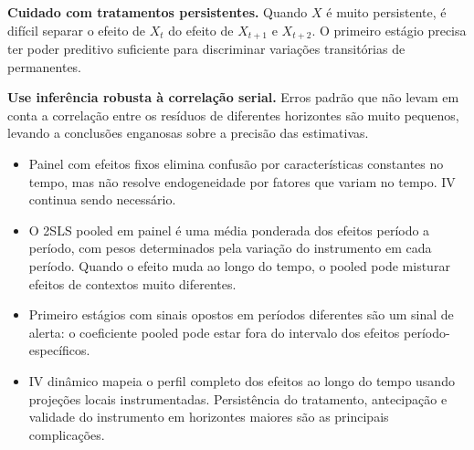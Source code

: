 \textbf{Cuidado com tratamentos persistentes.} Quando $X$ é muito persistente, é difícil separar o efeito de $X_t$ do efeito de $X_{t+1}$ e $X_{t+2}$. O primeiro estágio precisa ter poder preditivo suficiente para discriminar variações transitórias de permanentes.

\textbf{Use inferência robusta à correlação serial.} Erros padrão que não levam em conta a correlação entre os resíduos de diferentes horizontes são muito pequenos, levando a conclusões enganosas sobre a precisão das estimativas.

\begin{notabox}
\begin{itemize}[leftmargin=*]
  \item Painel com efeitos fixos elimina confusão por características constantes no tempo, mas não resolve endogeneidade por fatores que variam no tempo. IV continua sendo necessário.
  \item O 2SLS pooled em painel é uma média ponderada dos efeitos período a período, com pesos determinados pela variação do instrumento em cada período. Quando o efeito muda ao longo do tempo, o pooled pode misturar efeitos de contextos muito diferentes.
  \item Primeiro estágios com sinais opostos em períodos diferentes são um sinal de alerta: o coeficiente pooled pode estar fora do intervalo dos efeitos período-específicos.
  \item IV dinâmico mapeia o perfil completo dos efeitos ao longo do tempo usando projeções locais instrumentadas. Persistência do tratamento, antecipação e validade do instrumento em horizontes maiores são as principais complicações.
\end{itemize}
\end{notabox}
